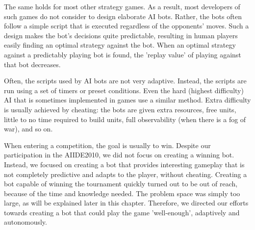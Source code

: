 The same holds for most other strategy games. As a result, most developers of such games do not consider to design elaborate AI bots. Rather, the bots often follow a simple script that is executed regardless of the opponents' moves. Such a design makes the bot's decisions quite predictable, resulting in human players easily finding an optimal strategy against the bot. When an optimal strategy against a predictably playing bot is found, the 'replay value' of playing against that bot decreases.

Often, the scripts used by AI bots are not very adaptive. Instead, the scripts are run using a set of timers or preset conditions. Even the hard (highest difficulty) AI that is sometimes implemented in games use a similar method. Extra difficulty is usually achieved by cheating: the bots are given extra resources, free units, little to no time required to build units, full observability (when there is a fog of war), and so on.







When entering a competition, the goal is usually to win. Despite our participation in the AIIDE2010, we did not focus on creating a winning bot. Instead, we focused on creating a bot that provides interesting gameplay that is not completely predictive and adapts to the player, without cheating. Creating a bot capable of winning the tournament quickly turned out to be out of reach, because of the time and knowledge needed. The problem space was simply too large, as will be explained later in this chapter. Therefore, we directed our efforts towards creating a bot that could play the game 'well-enough', adaptively and autonomously.

